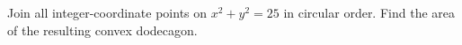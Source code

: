 Join all integer-coordinate points on $x^2+y^2=25$ in circular order. Find the area of the resulting convex dodecagon.
